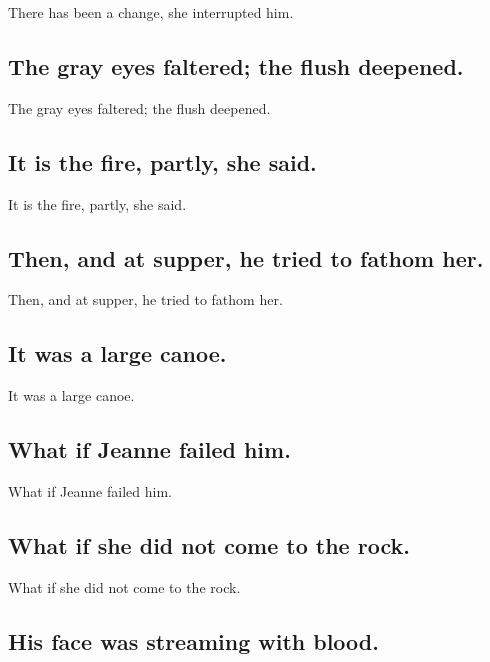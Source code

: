 \documentclass[]{article}
\begin{document}
There has been a change, she interrupted him.

\hypertarget{the-gray-eyes-faltered-the-flush-deepened.}{%
\subsection{The gray eyes faltered; the flush
deepened.}\label{the-gray-eyes-faltered-the-flush-deepened.}}

The gray eyes faltered; the flush deepened.

\hypertarget{it-is-the-fire-partly-she-said.}{%
\subsection{It is the fire, partly, she
said.}\label{it-is-the-fire-partly-she-said.}}

It is the fire, partly, she said.

\hypertarget{then-and-at-supper-he-tried-to-fathom-her.}{%
\subsection{Then, and at supper, he tried to fathom
her.}\label{then-and-at-supper-he-tried-to-fathom-her.}}

Then, and at supper, he tried to fathom her.

\hypertarget{it-was-a-large-canoe.}{%
\subsection{It was a large canoe.}\label{it-was-a-large-canoe.}}

It was a large canoe.

\hypertarget{what-if-jeanne-failed-him.}{%
\subsection{What if Jeanne failed
him.}\label{what-if-jeanne-failed-him.}}

What if Jeanne failed him.

\hypertarget{what-if-she-did-not-come-to-the-rock.}{%
\subsection{What if she did not come to the
rock.}\label{what-if-she-did-not-come-to-the-rock.}}

What if she did not come to the rock.

\hypertarget{his-face-was-streaming-with-blood.}{%
\subsection{His face was streaming with
blood.}\label{his-face-was-streaming-with-blood.}}
\end{document}

